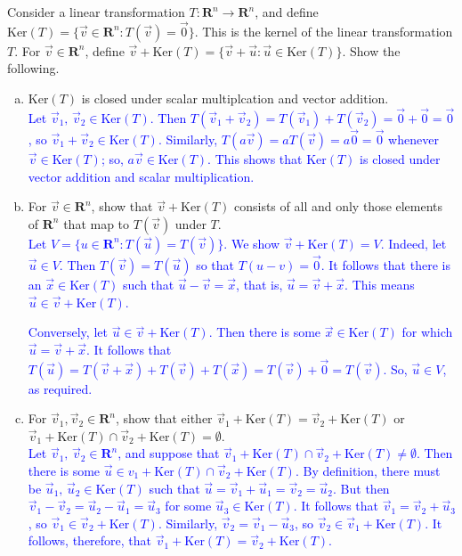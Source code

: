 \documentclass[a4paper,11pt]{article}
\newcommand{\R}{\mathbf{R}}
\newcommand{\BB}[1]{\textcolor{blue}{#1}}
\begin{document}
 Consider a linear transformation $T: \R^n
\rightarrow \R^n$, and define $\text{Ker}(T)=\{\vec v \in \R^n : T(\vec v)=\vec
0\}$. This is the kernel of the linear transformation $T$. For $\vec v \in
\R^n$, define $\vec v + \text{Ker}(T)=\{\vec v + \vec u : \vec u \in
\text{Ker}(T)\}$. Show the following.
\begin{enumerate}[(a)]
\item $\text{Ker}(T)$ is closed under scalar multiplcation and vector addition.\\

  \BB{Let $\vec v_1,\,\vec v_2 \in \text{Ker}(T)$. Then $T(\vec v_1+\vec
    v_2)=T(\vec v_1)+T(\vec v_2)=\vec 0+\vec 0=\vec 0$, so $\vec v_1+\vec v_2
    \in \text{Ker}(T)$. Similarly, $T(a\vec v)=aT(\vec v)=a\vec 0=\vec 0$
    whenever $\vec v \in \text{Ker}(T)$; so, $a\vec v \in \text{Ker}(T)$. This
    shows that $\text{Ker}(T)$ is closed under vector addition and scalar
    multiplication. \\}
  
\item For $\vec v \in \R^n$, show that $\vec v + \text{Ker}(T)$ consists of all
  and only those elements of $\R^n$ that map to $T(\vec v)$ under $T$. \\

  \BB{Let $V=\{u \in \R^n : T(\vec u)=T(\vec v)\}$. We show $\vec
    v+\text{Ker}(T)=V$. Indeed, let $\vec u \in V$. Then $T(\vec v)=T(\vec u)$
    so that $T(u-v)=\vec 0$. It follows that there is an $\vec x \in
    \text{Ker}(T)$ such that $\vec u-\vec v=\vec x$, that is, $\vec u=\vec
    v+\vec x$. This means $\vec u \in \vec v+\text{Ker}(T)$.}

  \BB{Conversely, let $\vec u \in \vec v+\text{Ker}(T)$. Then there is some
    $\vec x \in \text{Ker}(T)$ for which $\vec u=\vec v+\vec x.$ It follows that
  $T(\vec u)=T(\vec v+\vec x)+T(\vec v)+T(\vec x)=T(\vec v)+\vec 0=T(\vec v)$.
  So, $\vec u \in V$, as required. \\}

\item For $\vec v_1,\vec v_2 \in \R^n$, show that either $\vec
  v_1+\text{Ker}(T)=\vec v_2 +\text{Ker}(T)$ or $\vec v_1+\text{Ker}(T) \cap
  \vec v_2 +\text{Ker}(T)=\emptyset$. \\

  \BB{Let $\vec v_1,\,\vec v_2 \in \R^n$, and suppose that $\vec
    v_1+\text{Ker}(T) \cap \vec v_2+\text{Ker}(T) \neq \emptyset$. Then there is
    some $\vec u \in v_1+\text{Ker}(T) \cap \vec v_2+\text{Ker}(T)$. By
    definition, there must be $\vec u_1,\,\vec u_2 \in \text{Ker}(T)$ such that
    $\vec u=\vec v_1+\vec u_1=\vec v_2=\vec u_2$. But then $\vec v_1-\vec
    v_2=\vec u_2-\vec u_1=\vec u_3$ for some $\vec u_3 \in \text{Ker}(T)$. It
    follows that $\vec v_1=\vec v_2+\vec u_3$, so $\vec v_1 \in \vec
    v_2+\text{Ker}(T)$. Similarly, $\vec v_2=\vec v_1-\vec u_3$, so $\vec v_2 \in
    \vec v_1+\text{Ker}(T)$. It follows, therefore, that $\vec
    v_1+\text{Ker}(T)=\vec v_2+\text{Ker}(T)$.\\}
\end{enumerate}
\end{document}
